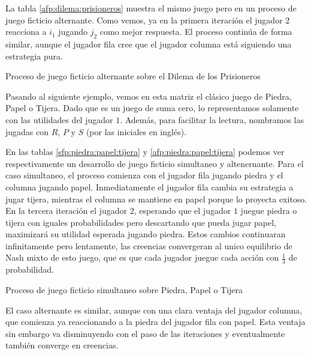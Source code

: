 La tabla \ref{afp:dilema:prisioneros} muestra el mismo juego pero en un proceso de juego ficticio alternante. Como vemos, ya en la primera iteración el jugador $2$ reacciona a $i_1$ jugando $j_2$ como mejor respuesta. El proceso continúa de forma similar, aunque el jugador fila cree que el jugador columna está siguiendo una estrategia pura.

\begin{table} %
    \centering
    
    \caption{Proceso de juego ficticio alternante sobre el Dilema de los Prisioneros}
    \label{afp:dilema:prisioneros}
\end{table}

Pasando al siguiente ejemplo, vemos en esta matriz el clásico juego de Piedra, Papel o Tijera. Dado que es un juego de suma cero, lo representamos solamente con las utilidades del jugador $1$. Además, para facilitar la lectura, nombramos las jugadas con $R$, $P$ y $S$ (por las iniciales en inglés).



En las tablas \ref{sfp:piedra:papel:tijera} y \ref{afp:piedra:papel:tijera} podemos ver respectivamente un desarrollo de juego ficticio simultaneo y altenernante. Para el caso simultaneo, el proceso comienza con el jugador fila jugando piedra y el columna jugando papel. Inmediatamente el jugador fila cambia su estrategia a jugar tijera, mientras el columna se mantiene en papel porque lo proyecta exitoso. En la tercera iteración el jugador $2$, esperando que el jugador $1$ juegue piedra o tijera con iguales probabilidades pero descartando que pueda jugar papel, maximizará su utilidad esperada jugando piedra. Estos cambios continuaran infinitamente pero lentamente, las creencias convergeran al unico equilibrio de Nash mixto de esto juego, que es que cada jugador juegue cada acción con $\frac{1}{3}$ de probabilidad. 

\begin{table} %
    \centering
    
    \caption{Proceso de juego ficticio simultaneo sobre Piedra, Papel o Tijera}
    \label{sfp:piedra:papel:tijera}
\end{table}

El caso alternante es similar, aunque con una clara ventaja del jugador columna, que comienza ya reaccionando a la piedra del jugador fila con papel. Esta ventaja sin embargo va disminuyendo con el paso de las iteraciones y eventualmente también converge en creencias.


